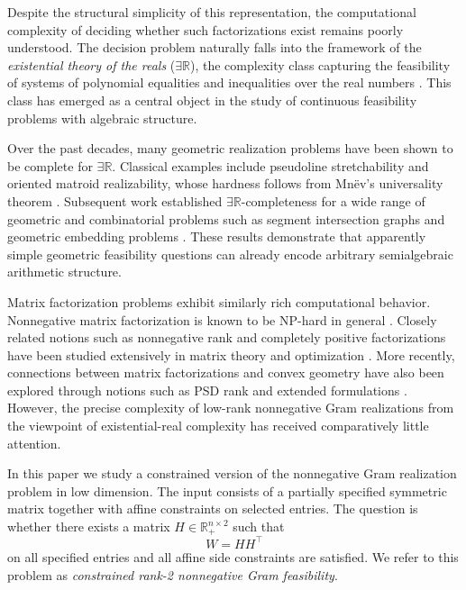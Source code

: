 \documentclass[11pt]{article}
\begin{document}
Despite the structural simplicity of this representation, the computational
complexity of deciding whether such factorizations exist remains poorly
understood. The decision problem naturally falls into the framework of
the \emph{existential theory of the reals} ($\exists\mathbb{R}$), the
complexity class capturing the feasibility of systems of polynomial
equalities and inequalities over the real numbers
\cite{schaefer2010complexity,cardinal2013survey}.
This class has emerged as a central object in the study of continuous
feasibility problems with algebraic structure.

Over the past decades, many geometric realization problems have been shown
to be complete for $\exists\mathbb{R}$. Classical examples include
pseudoline stretchability and oriented matroid realizability,
whose hardness follows from Mn\"ev's universality theorem
\cite{mnev1988universality,richter1996oriented}.
Subsequent work established $\exists\mathbb{R}$-completeness for a wide
range of geometric and combinatorial problems such as segment intersection graphs \cite{Foerster2026Thickness, Abrahamsen2025Embeddability} and geometric embedding problems
\cite{schaefer2010complexity,cardinal2013survey, Erickson2025Canonical}.
These results demonstrate that apparently simple geometric feasibility
questions can already encode arbitrary semialgebraic arithmetic structure.

Matrix factorization problems exhibit similarly rich computational
behavior. Nonnegative matrix factorization is known to be NP-hard
in general \cite{vavasis2009complexity}. Closely related notions such as
nonnegative rank and completely positive factorizations have been
studied extensively in matrix theory and optimization
\cite{cohen1993nonnegativerank,berman2003cp,bomze2018copositive}.
More recently, connections between matrix factorizations and convex
geometry have also been explored through notions such as PSD rank
and extended formulations \cite{fawzi2015psdrank}.
However, the precise complexity of low-rank nonnegative Gram realizations
from the viewpoint of existential-real complexity has received
comparatively little attention.

In this paper we study a constrained version of the nonnegative Gram
realization problem in low dimension.
The input consists of a partially specified symmetric matrix together
with affine constraints on selected entries.
The question is whether there exists a matrix
$H \in \mathbb{R}_+^{n\times 2}$ such that
\[
W = HH^\top
\]
on all specified entries and all affine side constraints are satisfied.
We refer to this problem as
\emph{constrained rank-2 nonnegative Gram feasibility}.
\end{document}
